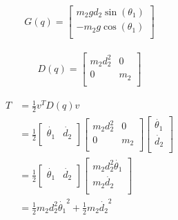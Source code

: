 \begin{solutionbox}[Q1-7]
    \begin{align*}
        G(q) = \begin{bmatrix}
                   m_2gd_2\sin(\theta_1) \\
                   -m_2g\cos(\theta_1)   \\
               \end{bmatrix}
    \end{align*}

    \begin{align*}
        D(q) = \begin{bmatrix}
                   m_2d_2^2 & 0   \\
                   0        & m_2 \\
               \end{bmatrix}
    \end{align*}

    \begin{align*}
        T & = \frac{1}{2}v^{T}D(q)v                                                \\
          & =
        \frac{1}{2}\begin{bmatrix}
                       \dot{\theta_1} & \dot{d_2} \\
                   \end{bmatrix}
        \begin{bmatrix}
            m_2d_2^2 & 0   \\
            0        & m_2 \\
        \end{bmatrix}
        \begin{bmatrix}
            \dot{\theta_1} \\
            \dot{d_2}      \\
        \end{bmatrix}                                                             \\
          & =
        \frac{1}{2}\begin{bmatrix}
                       \dot{\theta_1} & \dot{d_2} \\
                   \end{bmatrix}
        \begin{bmatrix}
            m_2d_2^2 \dot{\theta_1} \\
            m_2\dot{d_2}            \\
        \end{bmatrix}                                                    \\
          & = \frac{1}{2} m_2 d_2^2 \dot{\theta_1}^2 + \frac{1}{2} m_2 \dot{d_2}^2
    \end{align*}

\end{solutionbox}

